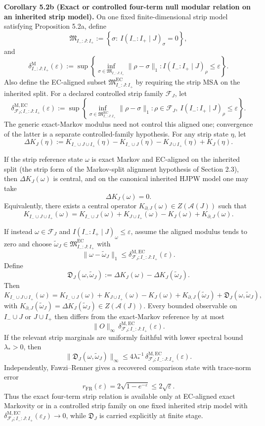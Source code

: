 \textbf{Corollary 5.2b (Exact or controlled four-term null modular relation on an inherited strip model).} On one fixed finite-dimensional strip model satisfying Proposition 5.2a, define
\[
\mathfrak M_{I_-:J:I_+}
:=
\left\{
\sigma:\ I(I_-:I_+\mid J)_\sigma=0
\right\},
\]
and
\[
\delta^{\mathrm M}_{I_-:J:I_+}(\varepsilon)
:=
\sup\left\{
\inf_{\sigma\in\mathfrak M_{I_-:J:I_+}}\|\rho-\sigma\|_1:
I(I_-:I_+\mid J)_\rho\le\varepsilon
\right\}.
\]
Also define the EC-aligned subset \(\mathfrak M^{\mathrm{EC}}_{I_-:J:I_+}\)
by requiring the strip MSA on the inherited split. For a declared controlled
strip family \(\mathcal F_J\), let
\[
\delta^{\mathrm{M,EC}}_{\mathcal F_J;I_-:J:I_+}(\varepsilon)
:=
\sup\left\{
\inf_{\sigma\in\mathfrak M^{\mathrm{EC}}_{I_-:J:I_+}}\|\rho-\sigma\|_1:
\rho\in\mathcal F_J,\ I(I_-:I_+\mid J)_\rho\le\varepsilon
\right\}.
\]
The generic exact-Markov modulus need not control this aligned one; convergence
of the latter is a separate controlled-family hypothesis.
For any strip state \(\eta\), let
\[
\Delta K_J(\eta)
:=
K_{I_-\cup J\cup I_+}(\eta)-K_{I_-\cup J}(\eta)-K_{J\cup I_+}(\eta)+K_J(\eta).
\]

If the strip reference state \(\omega\) is exact Markov and EC-aligned on the inherited split (the strip form of the Markov-split alignment hypothesis of Section 2.3), then \(\Delta K_J(\omega)\) is central, and on the canonical inherited HJPW model one may take
\[
\Delta K_J(\omega)=0.
\]
Equivalently, there exists a central operator \(K_{\partial,J}(\omega)\in Z(\mathcal A(J))\) such that
\[
K_{I_-\cup J\cup I_+}(\omega)
=
K_{I_-\cup J}(\omega)+K_{J\cup I_+}(\omega)-K_J(\omega)+K_{\partial,J}(\omega).
\]

If instead \(\omega\in\mathcal F_J\) and \(I(I_-:I_+\mid J)_\omega\le\varepsilon\), assume the aligned modulus tends to zero and choose \(\widetilde\omega_J\in\mathfrak M^{\mathrm{EC}}_{I_-:J:I_+}\) with
\[
\|\omega-\widetilde\omega_J\|_1
\le
\delta^{\mathrm{M,EC}}_{\mathcal F_J;I_-:J:I_+}(\varepsilon).
\]
Define
\[
\mathfrak D_J(\omega,\widetilde\omega_J)
:=
\Delta K_J(\omega)-\Delta K_J(\widetilde\omega_J).
\]
Then
\[
K_{I_-\cup J\cup I_+}(\omega)
=
K_{I_-\cup J}(\omega)+K_{J\cup I_+}(\omega)-K_J(\omega)
+K_{\partial,J}(\widetilde\omega_J)
+\mathfrak D_J(\omega,\widetilde\omega_J),
\]
with \(K_{\partial,J}(\widetilde\omega_J)=\Delta K_J(\widetilde\omega_J)\in Z(\mathcal A(J))\). Every bounded observable on \(I_-\cup J\) or \(J\cup I_+\) then differs from the exact-Markov reference by at most
\[
\|O\|_\infty\,\delta^{\mathrm{M,EC}}_{\mathcal F_J;I_-:J:I_+}(\varepsilon).
\]
If the relevant strip marginals are uniformly faithful with lower spectral bound \(\lambda_\ast>0\), then
\[
\|\mathfrak D_J(\omega,\widetilde\omega_J)\|_\infty
\le
4\lambda_\ast^{-1}\,\delta^{\mathrm{M,EC}}_{\mathcal F_J;I_-:J:I_+}(\varepsilon).
\]
Independently, Fawzi--Renner gives a recovered comparison state with trace-norm error
\[
r_{\mathrm{FR}}(\varepsilon)=2\sqrt{1-e^{-\varepsilon}}\le 2\sqrt{\varepsilon}.
\]
Thus the exact four-term strip relation is available only at EC-aligned exact Markovity or in a controlled strip family on one fixed inherited strip model with \(\delta^{\mathrm{M,EC}}_{\mathcal F_J;I_-:J:I_+}(\varepsilon_J)\to0\), while \(\mathfrak D_J\) is carried explicitly at finite stage.

